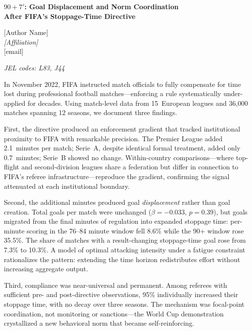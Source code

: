\documentclass[12pt]{article}
\begin{document}
\thispagestyle{empty}

\begin{center}
{\large\textbf{$90{+}7'$: Goal Displacement and Norm Coordination\\
After FIFA's Stoppage-Time Directive}}

\bigskip

{[Author Name]}\\
\textit{[Affiliation]}\\
{[email]}

\bigskip

\textit{JEL codes: L83, J44}
\end{center}

\bigskip

\noindent
In November 2022, FIFA instructed match officials to fully compensate
for time lost during professional football matches---enforcing a rule
systematically under-applied for decades. Using match-level data from
15~European leagues and 36,000 matches spanning 12 seasons, we document
three findings.

First, the directive produced an enforcement gradient that tracked
institutional proximity to FIFA with remarkable precision. The Premier
League added 2.1~minutes per match; Serie~A, despite identical formal
treatment, added only 0.7~minutes; Serie~B showed no change.
Within-country comparisons---where top-flight and second-division
leagues share a federation but differ in connection to FIFA's referee
infrastructure---reproduce the gradient, confirming the signal
attenuated at each institutional boundary.

Second, the additional minutes produced goal \textit{displacement}
rather than goal creation. Total goals per match were unchanged
($\beta = -0.033$, $p = 0.39$), but goals migrated from the final
minutes of regulation into expanded stoppage time: per-minute scoring
in the 76--84 minute window fell 8.6\% while the 90+ window rose
35.5\%. The share of matches with a result-changing stoppage-time goal
rose from 7.3\% to 10.3\%. A model of optimal attacking intensity
under a fatigue constraint rationalizes the pattern: extending the
time horizon redistributes effort without increasing aggregate output.

Third, compliance was near-universal and permanent. Among referees with
sufficient pre- and post-directive observations, 95\% individually
increased their stoppage time, with no decay over three seasons. The
mechanism was focal-point coordination, not monitoring or
sanctions---the World Cup demonstration crystallized a new behavioral
norm that became self-reinforcing.
\end{document}
